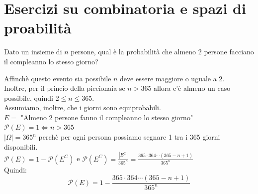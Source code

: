 \documentclass[12pt]{report}
\newcounter{exercise}
\begin{document}
	\section{Esercizi su combinatoria e spazi di proabilità}
	\begin{exercise}{}{}
		\begin{assignment}{}{}
			Dato un insieme di $n$ persone, qual è la probabilità che almeno 2 persone facciano il compleanno lo stesso giorno?
		\end{assignment}
		Affinchè questo evento sia possibile $n$ deve essere maggiore o uguale a 2. \\
		Inoltre, per il princio della piccionaia se $n > 365$ allora c'è almeno un caso possibile, quindi $2 \leq n \leq 365$. \\
		Assumiamo, inoltre, che i giorni sono equiprobabili. \\
		$E =$ "Almeno 2 persone fanno il compleanno lo stesso giorno" \\
		$\mathcal{P}(E) = 1 \iff n > 365$ \\
		$|\Omega| = 365^n$ perchè per ogni persona possiamo segnare 1 tra i 365 giorni disponibili. \\
		$\mathcal{P}(E) = 1 - \mathcal{P}(E^C)$ e $\mathcal{P}(E^C) = \frac{|E^C|}{365^n} = \frac{365 \cdot 364 \cdots (365 - n + 1)}{365^n}$ \\
		Quindi:
		\[
		\mathcal{P}(E) = 1 - \frac{365 \cdot 364 \cdots (365 - n + 1)}{365^n}
		\]
	\end{exercise}
\end{document}
